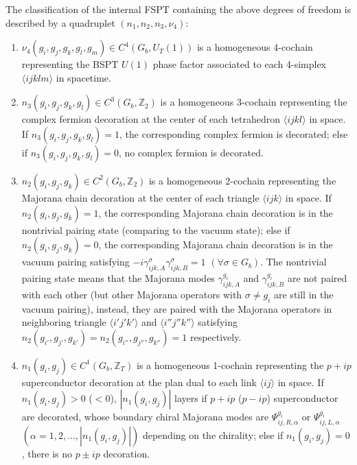 \documentclass[%
 reprint,
 amsmath,amssymb,
 aps,
prb,
]{revtex4-2}
\begin{document}
The classification of the internal FSPT containing the above degrees of freedom is described by a quadruplet $( n_{1}, n_{2}, n_{3}, \nu_{4} )$:
\begin{enumerate}
\item $\nu_{4} (g_{i}, g_{j}, g_{k}, g_{l}, g_{m}) \in C^{4} (G_{b}, U_{T}(1))$ is a homogeneous 4-cochain representing the BSPT $U(1)$ phase factor associated to each 4-simplex $\langle ijklm\rangle $ in spacetime.
\item $n_{3}(g_{i}, g_{j}, g_{k}, g_{l}) \in C^{3} (G_{b}, \mathbb Z_{2})$ is a homogeneous 3-cochain representing the complex fermion decoration at the center of each tetrahedron $\langle ijkl\rangle $ in space.
If $n_{3}(g_{i}, g_{j}, g_{k}, g_{l}) = 1$, the corresponding complex fermion is decorated; else if $n_{3}(g_{i}, g_{j}, g_{k}, g_{l}) = 0$, no complex fermion is decorated.
\item $n_{2}(g_{i}, g_{j}, g_{k}) \in C^{2} (G_{b}, \mathbb Z_{2})$ is a homogeneous 2-cochain representing the Majorana chain decoration at the center of each triangle $\langle ijk\rangle $ in space.
If $n_{2}(g_{i}, g_{j}, g_{k}) = 1$, the corresponding Majorana chain decoration is in the nontrivial pairing state (comparing to the vacuum state); else if $n_{2}(g_{i}, g_{j}, g_{k}) = 0$, the corresponding Majorana chain decoration is in the vacuum pairing satisfying $-i\gamma _{ijk,A}^{\sigma } \gamma _{ijk,B}^{\sigma } = 1$ $(\forall \sigma \in G_{b})$.
The nontrivial pairing state means that the Majorana modes $\gamma _{ijk,A}^{g_{i} }$ and $\gamma _{ijk,B}^{g_{i} }$ are not paired with each other (but other Majorana operators with $\sigma \neq g_{i}$ are still in the vacuum pairing), instead, they are paired with the Majorana operators in neighboring triangle $\langle i'j'k'\rangle $ and $\langle i''j''k''\rangle $ satisfying $n_{2}(g_{i'}, g_{j'}, g_{k'}) = n_{2}(g_{i''}, g_{j''}, g_{k''}) = 1$ respectively.
\item $n_{1}(g_{i}, g_{j}) \in C^{1} (G_{b}, \mathbb Z_{T})$ is a homogeneous 1-cochain representing the $p+ip$ superconductor decoration at the plan dual to each link $\langle ij\rangle $ in space.
If $n_{1}(g_{i}, g_{j}) > 0$ ($< 0$), $|n_{1}(g_{i}, g_{j})|$ layers if $p+ip$ ($p-ip$) superconductor are decorated, whose boundary chiral Majorana modes are $\Psi _{ij,R,\alpha}^{g_{i} }$ or $\Psi _{ij,L,\alpha}^{g_{i} }$ $(\alpha = 1,2,...,|n_{1}(g_{i}, g_{j})|)$ depending on the chirality; else if $n_{1}(g_{i}, g_{j}) = 0$, there is no $p \pm ip$ decoration.
\end{enumerate} 
\end{document}
